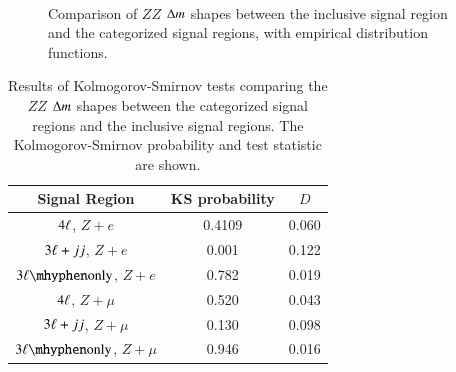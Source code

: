 \begin{figure}[htbp]
{		
	} \\
	\caption{Comparison of $ZZ$ $\Delta m$ shapes between the inclusive signal region and the categorized signal regions, with empirical distribution functions.}
	\label{fig:inclusive-KS-tests-ZZ}
\end{figure}

\begin{table}[htbp]
	\centering
	\begin{tabular}{ccc}
		Signal Region & KS probability & $D$ \\
		\hline
		$4\ell$, $Z+e$ & 0.4109& 0.060 \\
		$3\ell+jj$, $Z+e$ & 0.001 & 0.122 \\
		$\threelo$, $Z+e$ & 0.782 & 0.019 \\
		$4\ell$, $Z+\mu$ & 0.520 & 0.043 \\
		$3\ell+jj$, $Z+\mu$ & 0.130 & 0.098 \\
		$\threelo$, $Z+\mu$ & 0.946 & 0.016
	\end{tabular}
	\caption{Results of Kolmogorov-Smirnov tests comparing the $ZZ$ $\Delta m$ shapes between the categorized signal regions and the inclusive signal regions. The Kolmogorov-Smirnov probability and test statistic are shown.}
	\label{table:inclusive-KS-tests-ZZ}
\end{table}


